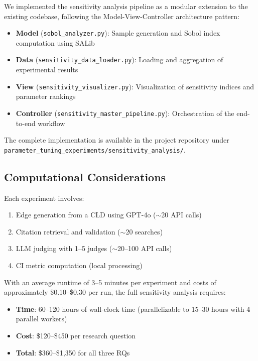 We implemented the sensitivity analysis pipeline as a modular extension to the existing codebase, following the Model-View-Controller architecture pattern:

\begin{itemize}
    \item \textbf{Model} (\texttt{sobol\_analyzer.py}): Sample generation and Sobol index computation using SALib
    \item \textbf{Data} (\texttt{sensitivity\_data\_loader.py}): Loading and aggregation of experimental results
    \item \textbf{View} (\texttt{sensitivity\_visualizer.py}): Visualization of sensitivity indices and parameter rankings
    \item \textbf{Controller} (\texttt{sensitivity\_master\_pipeline.py}): Orchestration of the end-to-end workflow
\end{itemize}

The complete implementation is available in the project repository under \texttt{parameter\_tuning\_experiments/sensitivity\_analysis/}.

\subsection{Computational Considerations}

Each experiment involves:
\begin{enumerate}
    \item Edge generation from a CLD using GPT-4o ($\sim$20 API calls)
    \item Citation retrieval and validation ($\sim$20 searches)
    \item LLM judging with 1--5 judges ($\sim$20--100 API calls)
    \item CI metric computation (local processing)
\end{enumerate}

With an average runtime of 3--5 minutes per experiment and costs of approximately \$0.10--\$0.30 per run, the full sensitivity analysis requires:

\begin{itemize}
    \item \textbf{Time}: 60--120 hours of wall-clock time (parallelizable to 15--30 hours with 4 parallel workers)
    \item \textbf{Cost}: \$120--\$450 per research question
    \item \textbf{Total}: \$360--\$1,350 for all three RQs
\end{itemize}

